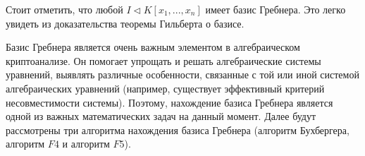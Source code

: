 Стоит отметить, что любой $I \triangleleft K \left[ x_{1}, ... , x_{n} \right]$ имеет базис Гребнера. Это легко увидеть из доказательства теоремы Гильберта о базисе.

Базис Гребнера является очень важным элементом в алгебраическом криптоанализе. Он помогает упрощать и решать алгебраические системы уравнений, выявлять различные особенности, связанные с той или иной системой алгебраических уравнений (например, существует эффективный критерий несовместимости системы). Поэтому, нахождение базиса Гребнера является одной из важных математических задач на данный момент. Далее будут рассмотрены три алгоритма нахождения базиса Гребнера (алгоритм Бухбергера, алгоритм $F4$ и алгоритм $F5$).

